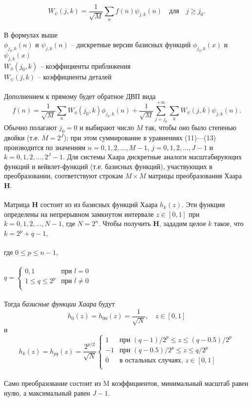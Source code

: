 \documentclass[12pt]{article}
\begin{document}
\[
W_\psi(j,k) = \dfrac{1}{\sqrt{M}} \sum_n f(n) \psi_{j,k}(n) \quad \text{для} \quad j \geq j_0.
\tag{12}
\]
\\
В формулах выше\\
$\phi_{j_0,k}(n)$ и $\psi_{j,k}(n)$ -- дискретные версии базисных функций $\phi_{j_0,k}(x)$ и $\psi_{j,k}(x)$\\
$W_\phi(j_0,k)$ -- коэффициенты приближения\\
$W_\psi(j,k)$ -- коэффициенты деталей\\
\\
Дополнением к прямому будет обратное ДВП вида\\
\[
f(n) = \dfrac{1}{\sqrt{M}} \sum_n W_\phi(j_0,k) \phi_{j_0,k}(n) + \dfrac{1}{\sqrt{M}} \sum_{j = j_0}^{+\infty} \sum_k W_\psi(j,k) \psi_{j,k}(n).
\tag{13}
\]
Обычно полагают $j_0 = 0$ и выбирают число $M$ так, чтобы оно было степенью двойки (т.е. $M = 2^J$); при этом суммирование в уравнениях (11)—(13) производится по значениям $n = 0, 1, 2, ..., M - 1$, $j = 0, 1, 2, ..., J - 1$ и $k = 0, 1, 2,
..., 2^J - 1$. Для системы Хаара дискретные аналоги масштабирующих функций и вейвлет-функций (т.е. базисных функций), участвующих в преобразовании, соответствуют строкам $M \times M$ матрицы преобразования Хаара \textbf{H}.\\
\\
Матрица \textbf{H} состоит из из базисных функций Хаара $h_k(z)$. Эти функции определены на непрерывном замкнутом интервале $z \in [0, 1]$ при $k = 0,1,2,...,N - 1$, где $N = 2^n$. Чтобы получить \textbf{H}, зададим целое $k$ такое, что $k = 2^p + q - 1$,\\
\\
где $0 \leq p \leq n - 1$,\\
\\
$
q = 
\begin{cases}
0, 1                & \text{при } l = 0\\
1 \leq q \leq 2^p   & \text{при } l \neq 0\\
\end{cases}
$\\
\\
Тогда \textit{базисные функции Хаара} будут
$$h_0(z) = h_{00}(z) = \dfrac{1}{\sqrt{N}}, \quad z \in [0,1]$$
и \[
h_k(z) = h_{pq}(z) = \dfrac{2^{p/2}}{\sqrt{N}}
\begin{cases}
1    & \text{при } (q - 1) / 2^p \leq z \leq (q - 0.5) / 2^p\\
-1   & \text{при } (q - 0.5) / 2^p \leq z \leq q / 2^p\\
0    & \text{в остальных случаях, } z \in [0,1]\\
\end{cases}
\]
\\
Само преобразование состоит из M коэффициентов, минимальный масштаб равен нулю, а максимальный равен $J - 1$.
\end{document}
